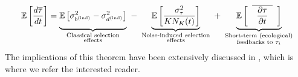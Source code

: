 \begin{equation}
\label{nD_stochastic_Fisher_turnover}
\mathbb{E}\left[\frac{d\overline{\tau}}{dt}\right] = \underbrace{\vphantom{ \mathbb{E}\left[\frac{\sigma^2_{\tau}}{KN_K(t)}\right] } \mathbb{E}\left[\sigma^2_{b^{\textrm{(ind)}}} - \sigma^2_{d^{\textrm{(ind)}}}\right]}_{\substack{\text{Classical selection} \\ \text{effects}}} \ - \ \underbrace{ \mathbb{E}\left[\frac{\sigma^2_{\tau}}{KN_K(t)}\right]}_{\substack{\text{Noise-induced selection} \\ \text{effects}}} \ + \ \underbrace{ \vphantom{ \mathbb{E}\left[\frac{\sigma^2_{\tau}}{KN_K(t)}\right] } \mathbb{E}\left[\hphantom{a}\overline{\hphantom{a}\frac{\partial \tau}{\partial t}\hphantom{a}}\hphantom{a}\right]}_{\substack{\text{Short-term (ecological)} \\ \text{feedbacks to $\tau_i$}}}
\end{equation}
The implications of this theorem have been extensively discussed in \citep{kuosmanen_turnover_2022}, which is where we refer the interested reader.

